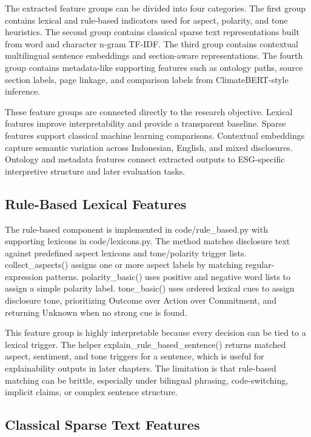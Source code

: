 The extracted feature groups can be divided into four categories. The first group contains lexical and rule-based indicators used for aspect, polarity, and tone heuristics. The second group contains classical sparse text representations built from word and character n-gram TF-IDF. The third group contains contextual multilingual sentence embeddings and section-aware representations. The fourth group contains metadata-like supporting features such as ontology paths, source section labels, page linkage, and comparison labels from ClimateBERT-style inference.

These feature groups are connected directly to the research objective. Lexical features improve interpretability and provide a transparent baseline. Sparse features support classical machine learning comparisons. Contextual embeddings capture semantic variation across Indonesian, English, and mixed disclosures. Ontology and metadata features connect extracted outputs to ESG-specific interpretive structure and later evaluation tasks.

\subsection{Rule-Based Lexical Features}

The rule-based component is implemented in code/rule\_based.py with supporting lexicons in code/lexicons.py. The method matches disclosure text against predefined aspect lexicons and tone/polarity trigger lists. collect\_aspects() assigns one or more aspect labels by matching regular-expression patterns. polarity\_basic() uses positive and negative word lists to assign a simple polarity label. tone\_basic() uses ordered lexical cues to assign disclosure tone, prioritizing Outcome over Action over Commitment, and returning Unknown when no strong cue is found.

This feature group is highly interpretable because every decision can be tied to a lexical trigger. The helper explain\_rule\_based\_sentence() returns matched aspect, sentiment, and tone triggers for a sentence, which is useful for explainability outputs in later chapters. The limitation is that rule-based matching can be brittle, especially under bilingual phrasing, code-switching, implicit claims, or complex sentence structure.

\subsection{Classical Sparse Text Features}

